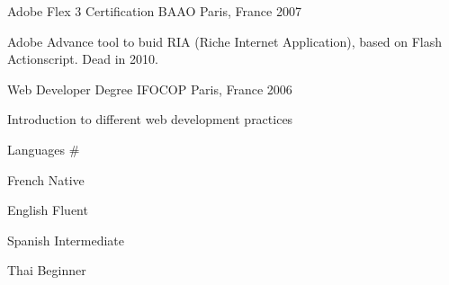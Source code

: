 

\begin{cventries}

  \cventry
    {Adobe Flex 3 Certification} %
    {BAAO} %
    {Paris, France} %
    {2007} %
    {
      \begin{cvitems} %
        \item {Adobe Advance tool to buid RIA (Riche Internet Application), based on Flash Actionscript. Dead in 2010.}
      \end{cvitems}
    }
  \cventry
    {Web Developer Degree} %
    {IFOCOP} %
    {Paris, France} %
    {2006} %
    {
      \begin{cvitems} %
        \item {Introduction to different web development practices}
      \end{cvitems}
    }

  \cventry
    {Languages} %
    {\#} %
    { } %
    { } %
    {
      \begin{cvitems} %
        \item {French Native}
        \item {English Fluent}
        \item {Spanish Intermediate}
        \item {Thai Beginner}
      \end{cvitems}
    }

\end{cventries}
